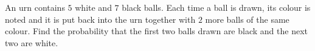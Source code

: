 An urn contains $5$ white and $7$ black balls. Each time a ball is drawn, its colour is noted and it is put back into the urn together with $2$ more balls of the same colour. Find the probability that the first two balls drawn are black and the next two are white.
